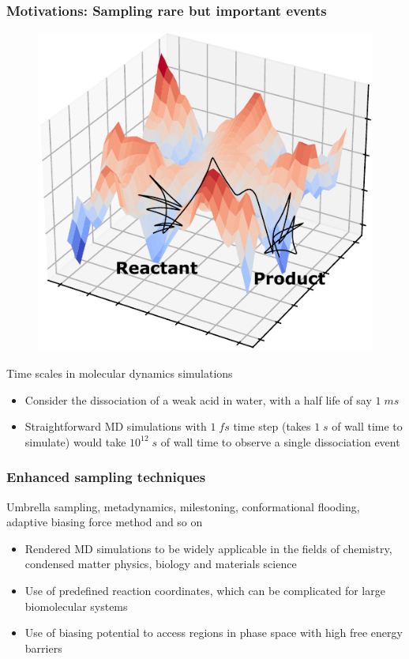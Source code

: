 \documentclass{beamer}
\begin{document}
\begin{frame}
\frametitle{Motivations: Sampling rare but important events}
\pause
\begin{figure}
\centering
\includegraphics[scale=0.5]{figures/pot-surf.pdf}
\end{figure}
\begin{block}{Time scales in molecular dynamics simulations}
{
    \begin{itemize}
        \item Consider the dissociation of a weak acid in water, with a half life of say $1\;ms$ 
        \item Straightforward MD simulations with $1\;fs$ time step (takes $1\;s$ of wall time to simulate)
        would take $10^{12}\;s$ of wall time to observe a single dissociation event 
    \end{itemize}
}
\end{block}
\end{frame}
\begin{frame}
\frametitle{Enhanced sampling techniques}
\pause
Umbrella sampling, metadynamics, milestoning, conformational flooding, adaptive biasing force method and so on 
\pause
\begin{block}
{
    \begin{itemize}
        \item Rendered MD simulations to be widely applicable in the fields of chemistry, condensed matter physics, biology and materials science
        \pause
        \item Use of predefined reaction coordinates, which can be complicated for large biomolecular systems
        \pause
        \item Use of biasing potential to access regions in phase space with high free energy barriers
    \end{itemize}
}
\end{block}
\end{frame}
\end{document}
